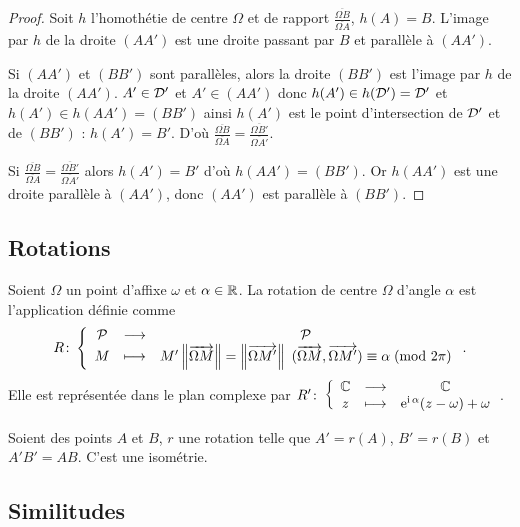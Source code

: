 \begin{proof}
    Soit \(h\) l'homothétie de centre \(\Omega\) et de rapport 
    \(\frac{\overline{\Omega B}}{\overline{\Omega A}}\), \(h(A) = B\). L'image 
    par \(h\) de la droite \((AA')\) est une droite passant par \(B\) et 
    parallèle à \((AA')\).

    Si \((AA')\) et \((BB')\) sont parallèles, alors la droite \((BB')\) est 
    l'image par \(h\) de la droite \((AA')\). \(A' \in \mathcal{D}'\) et \(A' \in 
    (AA')\) donc \(h(A') \in h(\mathcal{D}') = \mathcal{D}'\) et \(h(A') \in h(AA') = (BB')\) 
    ainsi \(h(A')\) est le point d'intersection de \(\mathcal{D}'\) et de \((BB')\) : 
    \(h(A') = B'\). D'où \(\frac{\overline{\Omega B}}{\overline{\Omega A}} = 
    \frac{\overline{\Omega B'}}{\overline{\Omega A'}}\).

    Si \(\frac{\overline{\Omega B}}{\overline{\Omega A}} = 
    \frac{\overline{\Omega B'}}{\overline{\Omega A'}}\) alors \(h(A') = B'\) 
    d'où \(h(AA') = (BB')\). Or \(h(AA')\) est une droite parallèle à \((AA')\), 
    donc \((AA')\) est parallèle à \((BB')\).
\end{proof}

\subsection{Rotations}

\begin{defdef}
    Soient \(\Omega\) un point d'affixe \(\omega\) et \(\alpha \in \mathbb{R}\). La 
    rotation de centre \(\Omega\) d'angle \(\alpha\) est l'application définie 
    comme 
    \begin{equation}
        R\colon \left\{\begin{array}{ccc} \mathcal{P} & \longrightarrow &\mathcal{P}\\ M & \longmapsto & M' \left\lVert\overrightarrow{\Omega M}\right\rVert= \left\lVert\overrightarrow{\Omega 
        M'}\right\rVert \ (\overrightarrow{\Omega M},\overrightarrow{\Omega M'}) \equiv \alpha\!\pmod {2\pi} \end{array} \right..
    \end{equation}
    Elle est représentée dans le plan complexe par 
    \(R'\colon \left\{\begin{array}{ccc} \mathbb{C} & \longrightarrow &\mathbb{C}\\ z & \longmapsto & \operatorname{e}^{\operatorname{i} \alpha}(z - \omega) + \omega \end{array} \right.\).
\end{defdef}

\begin{prop}
    Soient des points \(A\) et \(B\), \(r\) une rotation telle que \(A' = 
    r(A)\), \(B' = r(B)\) et \(A'B' = AB\). C'est une isométrie.
\end{prop}

\subsection{Similitudes}

